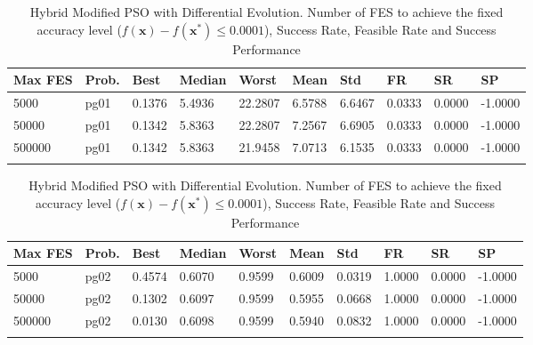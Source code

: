 \documentclass[10pt, a4paper]{book}
\begin{document}
\begin{center}
\begin{longtable}{l l l l l l l l l l}
\textbf{Max FES} & \textbf{Prob.} & \textbf{Best} & \textbf{Median} & \textbf{Worst} & \textbf{Mean} & \textbf{Std} & \textbf{FR} & \textbf{SR} & \textbf{SP} \\
\hline
5000 & pg01 & 0.1376 & 5.4936 & 22.2807 & 6.5788 & 6.6467 & 0.0333 & 0.0000 & -1.0000 \\
50000 & pg01 & 0.1342 & 5.8363 & 22.2807 & 7.2567 & 6.6905 & 0.0333 & 0.0000 & -1.0000 \\
500000 & pg01 & 0.1342 & 5.8363 & 21.9458 & 7.0713 & 6.1535 & 0.0333 & 0.0000 & -1.0000 \\

\caption{ Hybrid Modified PSO with Differential Evolution. Number of FES to achieve the fixed accuracy level ($f(\mathbf{x}) - f(\mathbf{x}^{*}) \leq 0.0001$), Success Rate, Feasible Rate and Success Performance }
\end{longtable}
\end{center}

\begin{center}
\begin{longtable}{l l l l l l l l l l}
\textbf{Max FES} & \textbf{Prob.} & \textbf{Best} & \textbf{Median} & \textbf{Worst} & \textbf{Mean} & \textbf{Std} & \textbf{FR} & \textbf{SR} & \textbf{SP} \\
\hline
5000 & pg02 & 0.4574 & 0.6070 & 0.9599 & 0.6009 & 0.0319 & 1.0000 & 0.0000 & -1.0000 \\
50000 & pg02 & 0.1302 & 0.6097 & 0.9599 & 0.5955 & 0.0668 & 1.0000 & 0.0000 & -1.0000 \\
500000 & pg02 & 0.0130 & 0.6098 & 0.9599 & 0.5940 & 0.0832 & 1.0000 & 0.0000 & -1.0000 \\

\caption{ Hybrid Modified PSO with Differential Evolution. Number of FES to achieve the fixed accuracy level ($f(\mathbf{x}) - f(\mathbf{x}^{*}) \leq 0.0001$), Success Rate, Feasible Rate and Success Performance }
\end{longtable}
\end{center}
\end{document}
